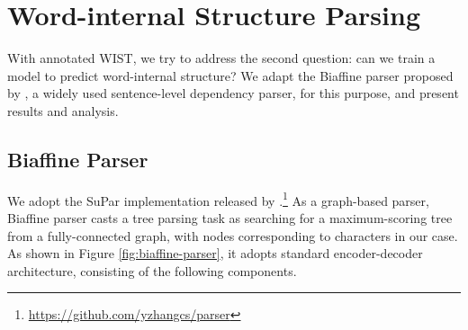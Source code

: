 
\section{Word-internal Structure Parsing}\label{sec:WIS-parsing}


With annotated WIST, we try to address the second question: can we train a model to predict word-internal structure? We adapt the Biaffine parser proposed by \citet{dozat2016deep}, a widely used sentence-level dependency parser, for this purpose, and present results and analysis.  

\subsection{Biaffine Parser}


We adopt the SuPar implementation released by  \citet{zhang-etal-2020-dep}.\footnote{\url{https://github.com/yzhangcs/parser}}  
As a graph-based parser, Biaffine parser casts a tree parsing task as searching for a maximum-scoring tree from a fully-connected graph, with nodes corresponding to characters in our case. As shown in Figure \ref{fig:biaffine-parser}, it adopts standard encoder-decoder architecture, consisting of the following components.  

